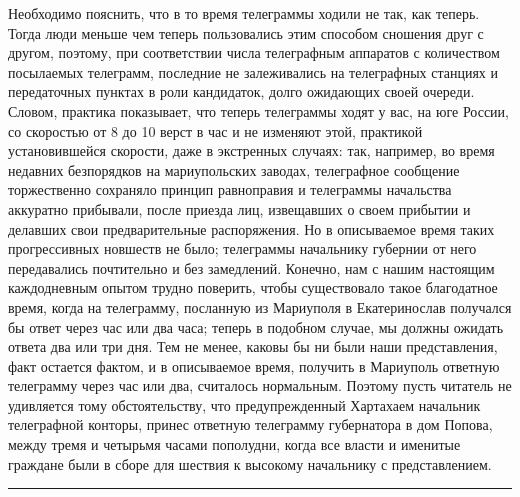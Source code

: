 \documentclass[a4paper,20pt]{article}
\begin{document}
Необходимо пояснить, что в то время телеграммы ходили не так, как теперь. 
Тогда люди меньше чем теперь пользовались этим способом сношения друг с другом,
поэтому, при соответствии числа телеграфным аппаратов с
количеством посылаемых телеграмм, последние не залеживались на телеграфных станциях 
и передаточных пунктах в роли кандидаток, долго ожидающих своей очереди.
Словом, практика показывает, что теперь телеграммы ходят у вас, на юге России, 
со скоростью от 8 до 10 верст в час и не изменяют этой, практикой установившейся скорости, 
даже в экстренных случаях: так, например, во время недавних безпорядков на 
мариупольских заводах, телеграфное сообщение торжественно сохраняло
принцип равноправия и телеграммы начальства аккуратно
прибывали, после приезда лиц, извещавших о своем прибытии
и делавших свои предварительные распоряжения. Но
в описываемое время таких прогрессивных новшеств не
было; телеграммы начальнику губернии от него передавались 
почтительно и без замедлений. Конечно, нам с нашим настоящим каждодневным 
опытом трудно поверить,
чтобы существовало такое благодатное время, когда на телеграмму, посланную из Мариуполя в 
Екатеринослав получался бы ответ через час или два часа; 
теперь в подобном случае, мы должны ожидать ответа два или три
дня. Тем не менее, каковы бы ни были наши представления,
факт остается фактом, и в описываемое время, получить
в Мариуполь ответную телеграмму через час или два,
считалось нормальным. Поэтому пусть читатель не удивляется 
тому обстоятельству, что предупрежденный Хартахаем
начальник телеграфной конторы, принес ответную телеграмму 
губернатора в дом Попова, между тремя и четырьмя
часами пополудни, когда все власти и именитые граждане
были в сборе для шествия к высокому начальнику с
представлением.

\par\noindent\rule{\textwidth}{0.4pt}
\end{document}
